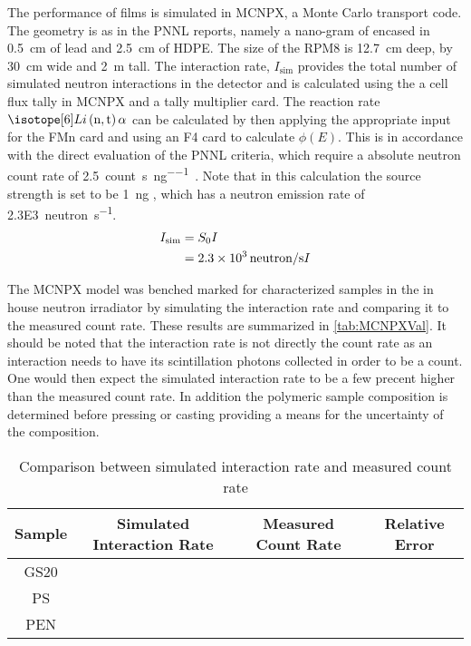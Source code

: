The performance of films is simulated in MCNPX, a Monte Carlo transport code\cite{pelowitz_mcnpx_????}.
The geometry is as in the PNNL reports, namely a nano-gram of   encased in \SI{0.5}{\cm} of lead and \SI{2.5}{\cm} of HDPE. 
The size of the RPM8 is \SI{12.7}{\cm} deep, by \SI{30}{\cm} wide and \SI{2}{\m} tall.
The interaction rate, $I_{\text{sim}}$ provides the total number of simulated neutron interactions in the detector and is calculated using the a cell flux tally in MCNPX and a tally multiplier card.
The reaction rate $\iso[6]{Li}\left(\text{n},\text{t}\right)\alpha$ can be calculated by then applying the appropriate input for the FMn card and using an F4 card to calculate $\phi(E)$.
This is in accordance with the direct evaluation of the PNNL criteria, which require a absolute neutron count rate of \SI{2.5}{count\per\second\per\nano\gram{}}.
Note that in this calculation the source strength is set to be \SI{1}{\nano\gram} , which has a neutron emission rate of \SI{2.3E3}{neutron\per\second}.
\begin{align}
  \label{eqn:RPM8InteractionRate}
  I_{\text{sim}} &= S_0 I \\
  &= \SI{2.3E3}{neutron\per\second} I
\end{align}
 
The MCNPX model was benched marked for characterized samples in the in house  neutron irradiator by simulating the interaction rate and comparing it to the measured count rate.
These results are summarized in \autoref{tab:MCNPXVal}.
It should be noted that the interaction rate is not directly the count rate as an interaction needs to have its scintillation photons collected in order to be a count. 
One would then expect the simulated interaction rate to be a few precent higher than the measured count rate.
In addition the polymeric sample composition is determined before pressing or casting providing a means for the uncertainty of the composition.
\begin{table}
	\caption[MCNPX Validation Results]{Comparison between simulated interaction rate and measured count rate}
	\label{tab:MCNPXVal}
	\begin{tabular}{c | c c | c}
		\toprule
			Sample & Simulated Interaction Rate & Measured Count Rate & Relative Error \\
		\midrule
			GS20 &  & &  \\ 
			PS & & & \\
			PEN & & & \\
		\bottomrule
	\end{tabular}
\end{table}
